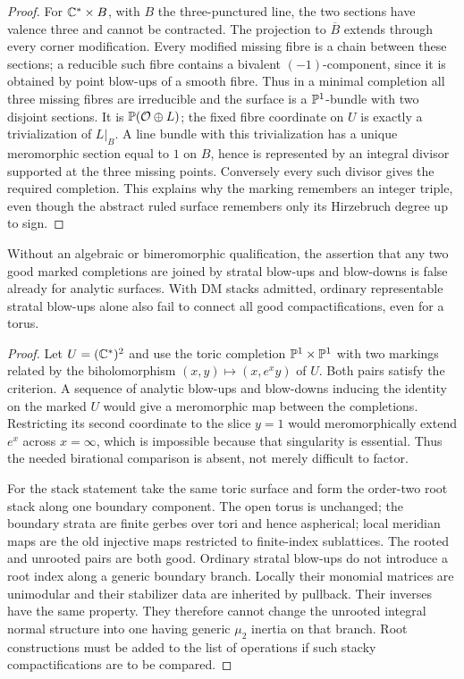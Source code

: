\begin{proof}
For $\mathbb C^*\times B$, with $B$ the three-punctured line, the two sections have
valence three and cannot be contracted.  The projection to $\overline B$
extends through every corner modification.  Every modified missing fibre is
a chain between these sections; a reducible such fibre contains a bivalent
$(-1)$-component, since it is obtained by point blow-ups of a smooth fibre.
Thus in a minimal completion all three missing fibres are irreducible and the
surface is a $\mathbb P^1$-bundle with two disjoint sections.  It is
$\mathbb P(\mathcal O\oplus L)$; the fixed fibre coordinate on $U$ is exactly a
trivialization of $L|_B$.  A line bundle with this trivialization has a unique
meromorphic section equal to $1$ on $B$, hence is represented by an integral
divisor supported at the three missing points.  Conversely every such divisor
gives the required completion.  This explains why the marking remembers an
integer triple, even though the abstract ruled surface remembers only its
Hirzebruch degree up to sign.
\end{proof}

\begin{proposition}\label{P3a-scope}
Without an algebraic or bimeromorphic qualification, the assertion that any
two good marked completions are joined by stratal blow-ups and blow-downs is
false already for analytic surfaces.  With DM stacks admitted, ordinary
representable stratal blow-ups alone also fail to connect all good
compactifications, even for a torus.
\end{proposition}
\begin{proof}
Let $U=(\mathbb C^*)^2$ and use the toric completion $\mathbb P^1\times\mathbb P^1$ with two
markings related by the biholomorphism $(x,y)\mapsto(x,e^x y)$ of $U$.
Both pairs satisfy the criterion.  A sequence of analytic blow-ups and
blow-downs inducing the identity on the marked $U$ would give a meromorphic
map between the completions.  Restricting its second coordinate to the slice
$y=1$ would meromorphically extend $e^x$ across $x=\infty$, which is impossible
because that singularity is essential.  Thus the needed birational comparison
is absent, not merely difficult to factor.

For the stack statement take the same toric surface and form the order-two
root stack along one boundary component.  The open torus is unchanged; the
boundary strata are finite gerbes over tori and hence aspherical; local
meridian maps are the old injective maps restricted to finite-index
sublattices.  The rooted and unrooted pairs are both good.  Ordinary stratal
blow-ups do not introduce a root index along a generic boundary branch.
Locally their monomial matrices are unimodular and their stabilizer data are
inherited by pullback.  Their inverses have the same property.  They therefore
cannot change the unrooted integral normal structure into one having generic
$\mu_2$ inertia on that branch.  Root constructions must be added to the list
of operations if such stacky compactifications are to be compared.
\end{proof}

